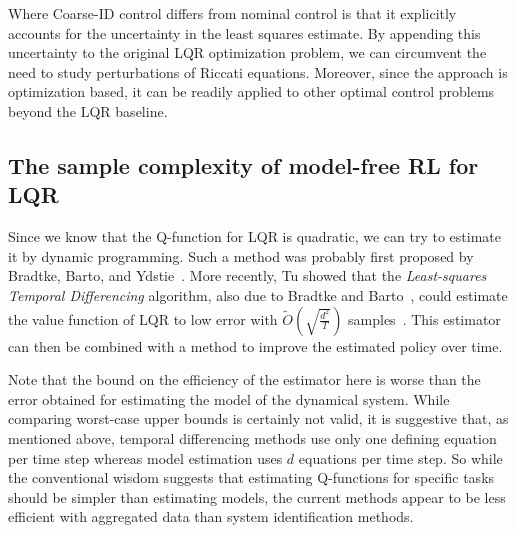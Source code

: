 \documentclass[11pt]{article}
\numberwithin{equation}{section}
\begin{document}
Where Coarse-ID control differs from nominal control is that it explicitly accounts for the uncertainty in the least squares estimate. By appending this uncertainty to the original LQR optimization problem, we can circumvent the need to study perturbations of Riccati equations. Moreover, since the approach is optimization based, it can be readily applied to other optimal control problems beyond the LQR baseline.

\subsection{The sample complexity of model-free RL for LQR}

Since we know that the Q-function for LQR is quadratic, we can try to estimate it by dynamic programming. Such a method was probably first proposed by Bradtke, Barto, and Ydstie~\cite{bradtke1994adaptive}. More recently, Tu showed that the \emph{Least-squares Temporal Differencing} algorithm, also due to Bradtke and Barto~\cite{bradtke1996linear}, could estimate the value function of LQR to low error with $\tilde{O}\left(\sqrt{\tfrac{d^2}{T}}\right)$ samples~\cite{Tu17b}. This estimator can then be combined with a method to improve the estimated policy over time.

Note that the bound on the efficiency of the estimator here is worse than the error obtained for estimating the model of the dynamical system. While comparing worst-case upper bounds is certainly not valid, it is suggestive that, as mentioned above, temporal differencing methods use only one defining equation per time step whereas model estimation uses $d$ equations per time step. So while the conventional wisdom suggests that estimating Q-functions for specific tasks should be simpler than estimating models, the current methods appear to be less efficient with aggregated data than system identification methods.
\end{document}
